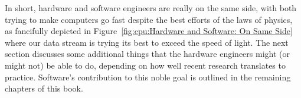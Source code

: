 In short, hardware and software engineers are really on the same side,
with both trying to make computers go fast despite the best efforts of
the laws of physics, as fancifully depicted in
Figure~\ref{fig:cpu:Hardware and Software: On Same Side}
where our data stream is trying its best to exceed the speed of light.
The next section discusses some additional things that the hardware engineers
might (or might not) be able to do, depending on how well recent
research translates to practice.
Software's contribution to this noble goal is outlined in the remaining
chapters of this book.
